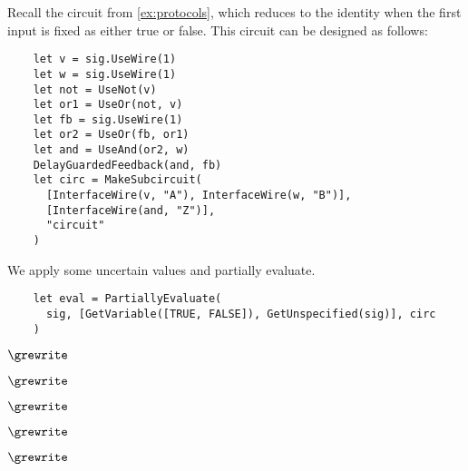 \begin{example}
  Recall the circuit from \cref{ex:protocols}, which reduces to the identity
  when the first input is fixed as either true or false.
  This circuit can be designed as follows:
  \begin{lstlisting}
    let v = sig.UseWire(1)
    let w = sig.UseWire(1)
    let not = UseNot(v)
    let or1 = UseOr(not, v)
    let fb = sig.UseWire(1)
    let or2 = UseOr(fb, or1)
    let and = UseAnd(or2, w)
    DelayGuardedFeedback(and, fb)
    let circ = MakeSubcircuit(
      [InterfaceWire(v, "A"), InterfaceWire(w, "B")],
      [InterfaceWire(and, "Z")],
      "circuit"
    )
  \end{lstlisting}
  \begin{center}
    
  \end{center}
  We apply some uncertain values and partially evaluate.
  \begin{lstlisting}
    let eval = PartiallyEvaluate(
      sig, [GetVariable([TRUE, FALSE]), GetUnspecified(sig)], circ
    )
  \end{lstlisting}
  \begin{center}
    
    \quad
    \(\grewrite\)

    \vspace{1em}

    
    \quad
    \(\grewrite\)

    \vspace{1em}

    
    \quad
    \(\grewrite\)

    \vspace{1em}

    
    \quad
    \(\grewrite\)


    \vspace{1em}

    
    \quad
    \(\grewrite\)
    \quad
    \raisebox{1em}{}
  \end{center}
\end{example}
